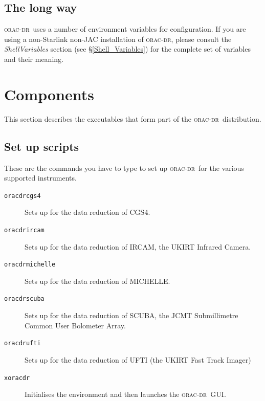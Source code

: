 \documentclass[twoside,11pt]{article}
\renewcommand{\_}{\texttt{\symbol{95}}}
\newcommand{\oracdr}{\textsc{orac-dr}}
\begin{document}
\subsection*{The long way\label{Setting_up_to_run_oracdr_The_long_way}}

\oracdr\ uses a number of environment variables for configuration. If
you are using a non-Starlink non-JAC installation of \oracdr, please
consult the \emph{ShellVariables} section (see
\S\ref{Shell_Variables}) for the complete set of variables and their
meaning.


\section{Components\label{Components}}

This section describes the executables that form part of the \oracdr\
distribution.

\subsection*{Set up scripts\label{ORAC-DR_Components_Set_up_scripts}}

These are the commands you have to type to set up \oracdr\ for the various
supported instruments.

\begin{description}
\item[\texttt{oracdr\_cgs4}] \mbox{}

Sets up for the data reduction of CGS4.

\item[\texttt{oracdr\_ircam}] \mbox{}

Sets up for the data reduction of IRCAM, the UKIRT Infrared Camera.

\item[\texttt{oracdr\_michelle}] \mbox{}

Sets up for the data reduction of MICHELLE.

\item[\texttt{oracdr\_scuba}] \mbox{}

Sets up for the data reduction of SCUBA, the JCMT Submillimetre Common
User Bolometer Array.

\item[\texttt{oracdr\_ufti}] \mbox{}

Sets up for the data reduction of UFTI (the UKIRT Fast Track Imager)

\item[\texttt{xoracdr}] \mbox{}

Initialises the environment and then launches the \oracdr\ GUI.

\end{description}
\end{document}
